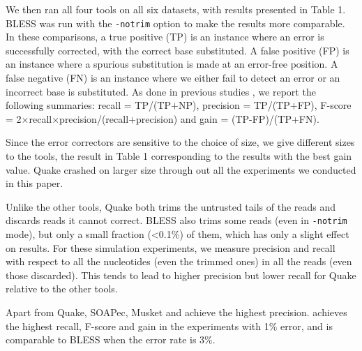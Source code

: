 \documentclass{bmcart}
\begin{document}
We then ran all four tools on all six datasets, with results presented in Table 1.  BLESS was run with the \verb+-notrim+ option to make the results more comparable. In these comparisons, a true positive (TP) is an instance where an error is successfully corrected, \thatis with the correct base substituted.  A false positive (FP) is an instance where a spurious substitution is made at an error-free position.  A false negative (FN) is an instance where we either fail to detect an error or an incorrect base is substituted.  As done in previous studies \cite{liu2013musket}, we report the following summaries: recall = TP/(TP$+$NP), precision = TP/(TP$+$FP), F-score = 2$\times$recall$\times$precision/(recall$+$precision) and gain = (TP-FP)/(TP+FN). 

Since the error correctors are sensitive to the choice of \kmer size, we give different sizes to the tools, the result in Table 1 corresponding to the results with the best gain value. Quake crashed on larger \kmer size through out all the experiments we conducted in this paper.

Unlike the other tools, Quake both trims the untrusted tails of the reads and discards reads it cannot correct. BLESS also trims some reads (even in \verb+-notrim+ mode), but only a small fraction (\textless0.1\%) of them, which has only a slight effect on results.  For these simulation experiments, we measure precision and recall with respect to all the nucleotides (even the trimmed ones) in all the reads (even those discarded).  This tends to lead to higher precision but lower recall for Quake relative to the other tools.


Apart from Quake, SOAPec, Musket and \tool achieve the highest precision.  \tool achieves the highest recall, F-score and gain in the experiments with 1\% error, and is comparable to BLESS when the error rate is 3\%.
\end{document}
